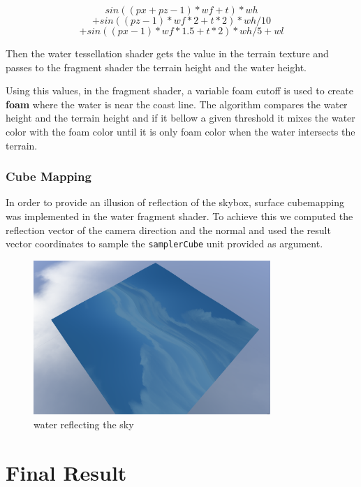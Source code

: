 \documentclass[a4paper]{report}
\begin{document}
\[  sin((px + pz - 1) * wf + t) * wh \]
\[ + sin((pz - 1) * wf * 2 + t * 2) * wh / 10 \]
\[ + sin((px - 1) * wf * 1.5 + t  * 2) * wh / 5  + wl \]

Then the water tessellation shader gets the value in the terrain texture and passes to the fragment shader
the terrain height and the water height.

Using this values, in the fragment shader, a variable foam cutoff is used to create \textbf{foam} where the water
is near the coast line. The algorithm compares the water height and the terrain height and if it bellow a given
threshold it mixes the water color with the foam color until it is only foam color when the water intersects the
terrain.

\subsection{Cube Mapping}

In order to provide an illusion of reflection of the skybox, surface cubemapping was implemented in the
water fragment shader. To achieve this we computed the reflection vector of the camera direction and the
normal and used the result vector coordinates to sample the \texttt{samplerCube} unit provided as argument.

\begin{figure}[H]
  \centering
  \includegraphics[width=0.8\textwidth]{images/water_reflection.png}
  \caption{water reflecting the sky}
\end{figure}

\chapter{Final Result}
\end{document}
